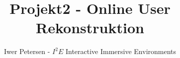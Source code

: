 \documentclass{lni}
\author{Iwer Petersen - $I^2E$ Interactive Immersive Environments}
\title{Projekt2 - Online User Rekonstruktion}
\begin{document}
\maketitle
\renewcommand{\refname}{Literaturverzeichnis}
\setcounter{footnote}{1} %







\end{document}
